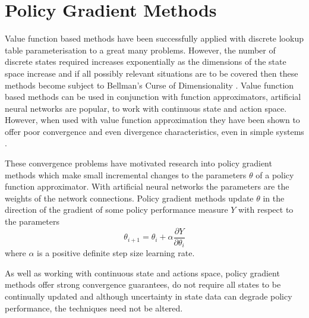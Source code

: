 \section{Policy Gradient Methods}
\label{sec:policygradient}
%
Value function based methods have been successfully applied with discrete lookup
table parameterisation to a great many problems.  However, the number of
discrete states required increases exponentially as the dimensions of the state space
increase and if all possibly relevant situations are to be covered then these
methods become subject to Bellman's Curse of Dimensionality
\cite{bellman:1961}.  Value function based methods can be used in conjunction
with function approximators, artificial neural networks are popular, to work
with continuous state and action space.  However, when used with value
function approximation they have been shown to offer poor convergence and even
divergence characteristics, even in simple systems \cite{peters:enac}.

These convergence problems have motivated research into policy gradient methods
which make small incremental changes to the parameters $\theta$ of a policy
function approximator.  With artificial neural networks the parameters are
the weights of the network connections.  Policy gradient methods update
$\theta$ in the direction of the gradient of some policy performance measure
$Y$ with respect to the parameters
\begin{equation}
\theta_{i+1} = \theta_i + \alpha \frac{\partial Y}{\partial \theta_i}
\end{equation}
where $\alpha$ is a positive definite step size learning rate.

As well as working with continuous state and actions space, policy gradient
methods offer strong convergence guarantees, do not require all states to be
continually updated and although uncertainty in state data can degrade policy
performance, the techniques need not be altered.

